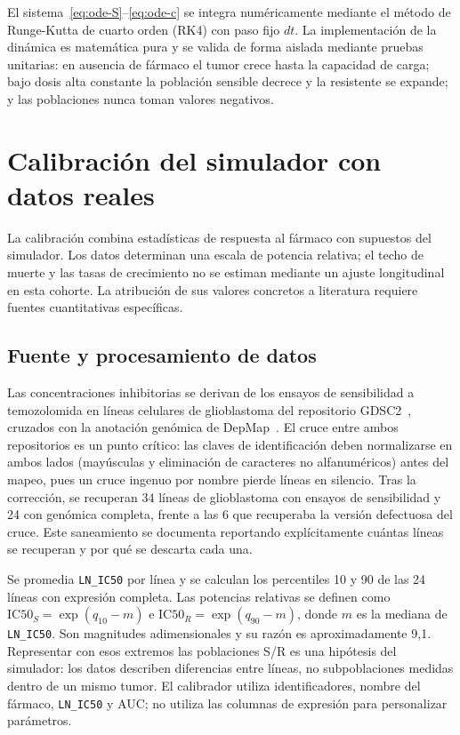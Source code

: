 El sistema~\eqref{eq:ode-S}--\eqref{eq:ode-c} se integra numéricamente mediante el método de Runge-Kutta de cuarto orden (RK4) con paso fijo $dt$. La implementación de la dinámica es matemática pura y se valida de forma aislada mediante pruebas unitarias: en ausencia de fármaco el tumor crece hasta la capacidad de carga; bajo dosis alta constante la población sensible decrece y la resistente se expande; y las poblaciones nunca toman valores negativos.

\section{Calibración del simulador con datos reales}
\label{sec:calibracion}

La calibración combina estadísticas de respuesta al fármaco con supuestos del simulador. Los datos determinan una escala de potencia relativa; el techo de muerte y las tasas de crecimiento no se estiman mediante un ajuste longitudinal en esta cohorte. La atribución de sus valores concretos a literatura requiere fuentes cuantitativas específicas.

\subsection{Fuente y procesamiento de datos}

Las concentraciones inhibitorias se derivan de los ensayos de sensibilidad a temozolomida en líneas celulares de glioblastoma del repositorio GDSC2~\cite{GDSC}, cruzados con la anotación genómica de DepMap~\cite{DepMap}. El cruce entre ambos repositorios es un punto crítico: las claves de identificación deben normalizarse en ambos lados (mayúsculas y eliminación de caracteres no alfanuméricos) antes del mapeo, pues un cruce ingenuo por nombre pierde líneas en silencio. Tras la corrección, se recuperan 34 líneas de glioblastoma con ensayos de sensibilidad y 24 con genómica completa, frente a las 6 que recuperaba la versión defectuosa del cruce. Este saneamiento se documenta reportando explícitamente cuántas líneas se recuperan y por qué se descarta cada una.

Se promedia \texttt{LN\_IC50} por línea y se calculan los percentiles 10 y 90 de las 24 líneas con expresión completa. Las potencias relativas se definen como $\mathrm{IC50}_S=\exp(q_{10}-m)$ e $\mathrm{IC50}_R=\exp(q_{90}-m)$, donde $m$ es la mediana de \texttt{LN\_IC50}. Son magnitudes adimensionales y su razón es aproximadamente 9,1. Representar con esos extremos las poblaciones S/R es una hipótesis del simulador: los datos describen diferencias entre líneas, no subpoblaciones medidas dentro de un mismo tumor. El calibrador utiliza identificadores, nombre del fármaco, \texttt{LN\_IC50} y AUC; no utiliza las columnas de expresión para personalizar parámetros.


